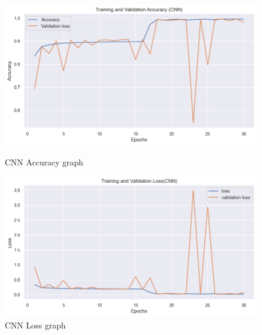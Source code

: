 		\begin{figure}[t]
			\centering
			\begin{minipage}{0.4\textwidth}
			  \centering
			  \includegraphics[width=1\textwidth]{figures/CNN_training_validation.png}
			  \caption{CNN Accuracy graph}
			  \label{fig:1}
			\end{minipage}
			\hfill
			\begin{minipage}{0.4\textwidth}
			  \centering
			  \includegraphics[width=1\textwidth]{figures/CNN_training_validation_loss.png}
			  \caption{CNN Loss graph}
			  \label{fig:2}
			\end{minipage}
		\end{figure}


		



